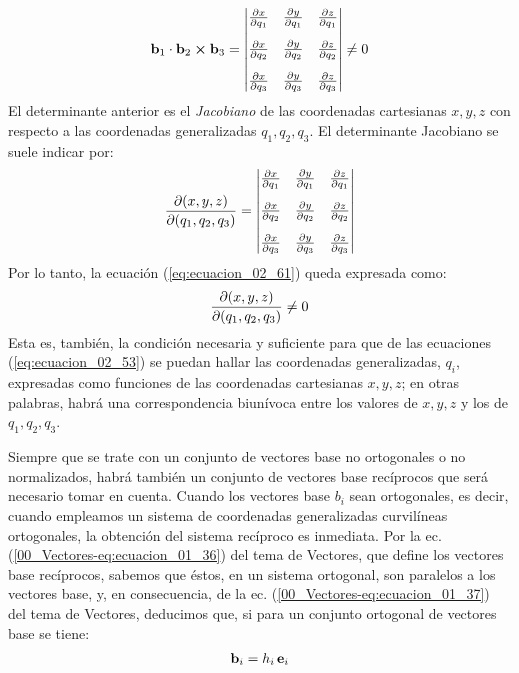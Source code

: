 \bgroup
\everymath{\displaystyle}
\begin{align}
    \vb{b}_{1} \cdot \vb{b}_{2} \cp \vb{b}_{3} = \mdet{
        \pdv{x}{q_{1}} & \pdv{y}{q_{1}} & \pdv{z}{q_{1}} \\[1em]
        \pdv{x}{q_{2}} & \pdv{y}{q_{2}} & \pdv{z}{q_{2}} \\[1em]
        \pdv{x}{q_{3}} & \pdv{y}{q_{3}} & \pdv{z}{q_{3}}
    } \neq 0
    \label{eq:ecuacion_02_61}
\end{align}
\egroup
El determinante anterior es el \emph{Jacobiano} de las coordenadas cartesianas $x, y, z$ con respecto a las coordenadas generalizadas $q_{1}, q_{2}, q_{3}$. El determinante Jacobiano se suele indicar por:
\bgroup
\everymath{\displaystyle}
\begin{align}
    \pdv{(x, y, z)}{(q_{1}, q_{2}, q_{3})} = \mdet{
        \pdv{x}{q_{1}} & \pdv{y}{q_{1}} & \pdv{z}{q_{1}} \\[1em]
        \pdv{x}{q_{2}} & \pdv{y}{q_{2}} & \pdv{z}{q_{2}} \\[1em]
        \pdv{x}{q_{3}} & \pdv{y}{q_{3}} & \pdv{z}{q_{3}}
    }
    \label{eq:ecuacion_02_62}
\end{align}
\egroup
Por lo tanto, la ecuación (\ref{eq:ecuacion_02_61}) queda expresada como:
\begin{align*}
    \pdv{(x, y, z)}{(q_{1}, q_{2}, q_{3})} \neq 0
\end{align*}
Esta es, también, la condición necesaria y suficiente para que de las ecuaciones (\ref{eq:ecuacion_02_53}) se puedan hallar las coordenadas generalizadas, $q_{i}$, expresadas como funciones de las coordenadas cartesianas $x, y, z$; en otras palabras, habrá una correspondencia biunívoca entre los valores de $x, y, z$ y los de $q_{1}, q_{2}, q_{3}$.
\par
Siempre que se trate con un conjunto de vectores base no ortogonales o no normalizados, habrá también un conjunto de vectores base recíprocos que será necesario tomar en cuenta. Cuando los vectores base $b_{i}$ sean ortogonales, es decir, cuando empleamos un sistema de coordenadas generalizadas curvilíneas ortogonales, la obtención del sistema recíproco es inmediata. Por la ec. (\ref{00_Vectores-eq:ecuacion_01_36}) del tema de Vectores, que define los vectores base recíprocos, sabemos que éstos, en un sistema ortogonal, son paralelos a los vectores base, y, en consecuencia, de la ec. (\ref{00_Vectores-eq:ecuacion_01_37}) del tema de Vectores, deducimos que, si para un conjunto ortogonal de vectores base se tiene:
\begin{align}
    \vb{b}_{i} = h_{i} \, \vb{e}_{i}
    \label{eq:ecuacion_02_63} 
\end{align}
